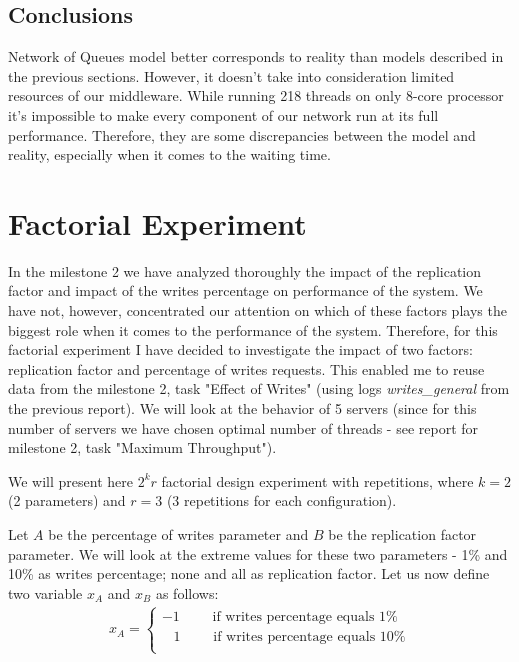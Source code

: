 \documentclass[11pt]{article}
\begin{document}
\subsection{Conclusions}
Network of Queues model better corresponds to reality than models described in the previous sections. However, it doesn't take into consideration limited resources of our middleware. While running 218 threads on only 8-core processor it's impossible to make every component of our network run at its full performance. Therefore, they are some discrepancies between the model and reality, especially when it comes to the waiting time.


\clearpage

\section{Factorial Experiment}\label{sec:2k-experiment}

\iffalse
Length: 1-3 pages

Design a $2^k$ factorial experiment and follow the best practices outlined in the book and in the lecture to analyze the results. You are free to choose the parameters for the experiment and in case you have already collected data in the second milestone that can be used as source for this experiment, you can reuse it. Otherwise, in case you need to run new experiments anyway, we recommend exploring the impact of request size on the middleware together with an other parameter.
\fi

In the milestone 2 we have analyzed thoroughly the impact of the replication factor and impact of the writes percentage on performance of the system. We have not, however, concentrated our attention on which of these factors plays the biggest role when it comes to the performance of the system. Therefore, for this factorial experiment I have decided to investigate the impact of two factors: replication factor and percentage of writes requests. This enabled me to reuse data from the milestone 2, task "Effect of Writes" (using logs {\it writes\_general} from the previous report). We will look at the behavior of 5 servers (since for this number of servers we have chosen optimal number of threads - see report for milestone 2, task "Maximum Throughput").

We will present here $2^kr$ factorial design experiment with repetitions, where $k = 2$ (2 parameters) and $r = 3$ (3 repetitions for each configuration).

Let $A$ be the percentage of writes parameter and $B$ be the replication factor parameter. We will look at the extreme values for these two parameters - 1\% and 10\% as writes percentage; none and all as replication factor. Let us now define two variable $x_A$ and $x_B$ as follows:
\begin{gather*}
x_A = 
\begin{cases}
-1 \qquad \text{ if writes percentage equals 1\%} \\ 
\;\;\;1 \qquad \text{ if writes percentage equals 10\%} \\ 
\end{cases}
\end{gather*}
\end{document}
